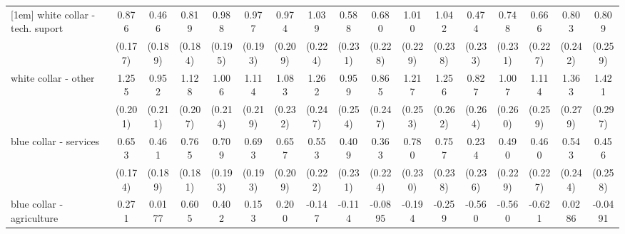 {\begin{tabular}{l*{16}{c}}
[1em]
white collar - tech. suport&       0.876\sym{***}&       0.466\sym{*}  &       0.819\sym{***}&       0.988\sym{***}&       0.977\sym{***}&       0.974\sym{***}&       1.039\sym{***}&       0.588\sym{*}  &       0.680\sym{**} &       1.010\sym{***}&       1.042\sym{***}&       0.474\sym{*}  &       0.748\sym{**} &       0.666\sym{**} &       0.803\sym{***}&       0.809\sym{**} \\
                    &     (0.177)         &     (0.189)         &     (0.184)         &     (0.195)         &     (0.193)         &     (0.209)         &     (0.224)         &     (0.231)         &     (0.228)         &     (0.229)         &     (0.238)         &     (0.233)         &     (0.231)         &     (0.227)         &     (0.242)         &     (0.259)         \\
[1em]
white collar - other&       1.255\sym{***}&       0.952\sym{***}&       1.128\sym{***}&       1.006\sym{***}&       1.114\sym{***}&       1.083\sym{***}&       1.262\sym{***}&       0.959\sym{***}&       0.865\sym{***}&       1.217\sym{***}&       1.256\sym{***}&       0.827\sym{**} &       1.007\sym{***}&       1.114\sym{***}&       1.363\sym{***}&       1.421\sym{***}\\
                    &     (0.201)         &     (0.211)         &     (0.207)         &     (0.214)         &     (0.219)         &     (0.232)         &     (0.247)         &     (0.254)         &     (0.247)         &     (0.253)         &     (0.262)         &     (0.264)         &     (0.260)         &     (0.259)         &     (0.279)         &     (0.297)         \\
[1em]
blue collar - services&       0.653\sym{***}&       0.461\sym{*}  &       0.765\sym{***}&       0.709\sym{***}&       0.693\sym{***}&       0.657\sym{**} &       0.553\sym{*}  &       0.409         &       0.363         &       0.780\sym{***}&       0.757\sym{**} &       0.234         &       0.490\sym{*}  &       0.460\sym{*}  &       0.543\sym{*}  &       0.456         \\
                    &     (0.174)         &     (0.189)         &     (0.181)         &     (0.193)         &     (0.193)         &     (0.209)         &     (0.222)         &     (0.231)         &     (0.224)         &     (0.230)         &     (0.238)         &     (0.236)         &     (0.229)         &     (0.227)         &     (0.244)         &     (0.258)         \\
[1em]
blue collar - agriculture&       0.271         &      0.0177         &       0.605\sym{*}  &       0.402         &       0.153         &       0.200         &      -0.147         &      -0.114         &     -0.0895         &      -0.194         &      -0.259         &      -0.560         &      -0.560         &      -0.621         &      0.0286         &     -0.0491         \\

\end{tabular}}

